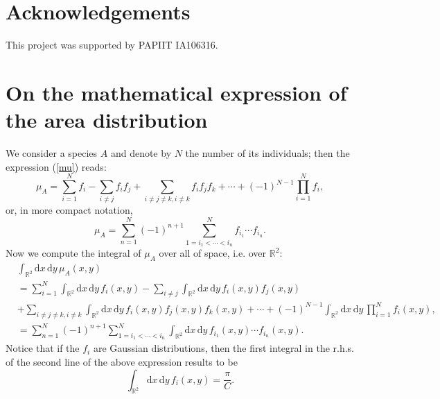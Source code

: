 \documentclass[12pt]{article}
\newcommand{\xd}{\mathrm{d}}
\numberwithin{equation}{section} %
\numberwithin{figure}{section} %
\theoremstyle{definition}
\begin{document}
\section*{Acknowledgements}

This project was supported by PAPIIT IA106316.





\appendix
\section{On the mathematical expression of the area distribution}
We consider a species $A$ and denote by $N$ the number of its individuals; then the expression (\ref{mu}) reads:
\begin{equation}
\mu_A = \sum_{i=1}^N f_{i} - \sum_{i \neq j} f_{i} f_{j} + \sum_{i \neq j \neq k,  i \neq k } f_{i} f_{j} f_{k} + \cdots + (-1)^{N-1} \prod_{i=1}^Nf_i,
\end{equation}
or, in more compact notation,
\begin{equation}
\mu_A = \sum_{n=1}^N (-1)^{n+1} \sum_{ 1=i_1< \cdots <i_n }^N f_{i_1} \cdots f_{i_n}.
\end{equation}
Now we compute the integral of $\mu_A$ over all of space, i.e. over ${\mathbb R}^2$:
\begin{align}
&\int_{{\mathbb R}^2} \xd x \, \xd y \, \mu_A(x,y) \nonumber\\
&=  \sum_{i=1}^N \int_{{\mathbb R}^2} \xd x \, \xd y \, f_{i}(x,y) - \sum_{i \neq j} \int_{{\mathbb R}^2} \xd x \, \xd y \, f_{i}(x,y) f_{j}(x,y)  \nonumber\\
& + \sum_{i \neq j \neq k,  i \neq k } \int_{{\mathbb R}^2} \xd x \, \xd y \, f_{i}(x,y) f_{j}(x,y) f_{k}(x,y) + \cdots + (-1)^{N-1} \int_{{\mathbb R}^2} \xd x \, \xd y \,\prod_{i=1}^Nf_i(x,y), \nonumber\\
&= \sum_{n=1}^N (-1)^{n+1} \sum_{ 1=i_1< \cdots <i_n }^N
\int_{{\mathbb R}^2} \xd x \, \xd y \,  f_{i_1} (x,y)\cdots f_{i_n} (x,y).
\end{align}
Notice that if the $f_i$ are Gaussian distributions, then the first integral in the r.h.s. of the second line of the above expression results to be
\begin{equation}
\int_{{\mathbb R}^2} \xd x \, \xd y \, f_{i}(x,y) = \frac{\pi}{C}.
\end{equation}
\end{document}
